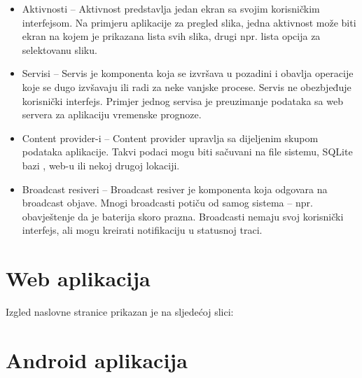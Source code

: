 \documentclass[12pt, a4paper]{report}
\theoremstyle{definition}
\begin{document}
\begin{itemize}
	\item Aktivnosti – Aktivnost predstavlja jedan ekran sa svojim korisničkim interfejsom. Na primjeru aplikacije za pregled slika, jedna aktivnost može biti ekran na kojem je prikazana lista svih slika, drugi npr. lista opcija za selektovanu sliku.
	\item Servisi – Servis je komponenta koja se izvršava u pozadini i obavlja operacije koje se dugo izvšavaju ili radi za neke vanjske procese. Servis ne obezbjeđuje korisnički interfejs. Primjer jednog servisa je preuzimanje podataka sa web servera za aplikaciju vremenske prognoze.
	\item Content provider-i – Content provider upravlja sa dijeljenim skupom podataka aplikacije. Takvi podaci mogu biti sačuvani na file sistemu, SQLite bazi , web-u ili nekoj drugoj lokaciji.
	\item Broadcast resiveri – Broadcast resiver je komponenta koja odgovara na broadcast objave. Mnogi broadcasti potiču od samog sistema – npr. obavještenje da je baterija skoro prazna. Broadcasti nemaju svoj korisnički interfejs, ali mogu kreirati notifikaciju u statusnoj traci.
\end{itemize}

\chapter{Web aplikacija}

Izgled naslovne stranice prikazan je na sljedećoj slici:


\chapter{Android aplikacija}
\end{document}
